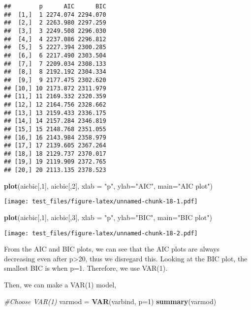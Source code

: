 \documentclass[]{article}
\newenvironment{Shaded}{\begin{snugshade}}{\end{snugshade}}
\newcommand{\KeywordTok}[1]{\textcolor[rgb]{0.13,0.29,0.53}{\textbf{#1}}}
\newcommand{\DataTypeTok}[1]{\textcolor[rgb]{0.13,0.29,0.53}{#1}}
\newcommand{\DecValTok}[1]{\textcolor[rgb]{0.00,0.00,0.81}{#1}}
\newcommand{\StringTok}[1]{\textcolor[rgb]{0.31,0.60,0.02}{#1}}
\newcommand{\CommentTok}[1]{\textcolor[rgb]{0.56,0.35,0.01}{\textit{#1}}}
\newcommand{\NormalTok}[1]{#1}
\begin{document}
\begin{verbatim}
##        p      AIC      BIC
##  [1,]  1 2274.074 2294.070
##  [2,]  2 2263.980 2297.259
##  [3,]  3 2249.508 2296.030
##  [4,]  4 2237.086 2296.812
##  [5,]  5 2227.394 2300.285
##  [6,]  6 2217.490 2303.504
##  [7,]  7 2209.034 2308.133
##  [8,]  8 2192.192 2304.334
##  [9,]  9 2177.475 2302.620
## [10,] 10 2173.872 2311.979
## [11,] 11 2169.332 2320.359
## [12,] 12 2164.756 2328.662
## [13,] 13 2159.433 2336.175
## [14,] 14 2157.284 2346.819
## [15,] 15 2148.768 2351.055
## [16,] 16 2143.984 2358.979
## [17,] 17 2139.605 2367.264
## [18,] 18 2129.737 2370.017
## [19,] 19 2119.909 2372.765
## [20,] 20 2113.135 2378.523
\end{verbatim}

\begin{Shaded}
\begin{Highlighting}[]
\KeywordTok{plot}\NormalTok{(aicbic[,}\DecValTok{1}\NormalTok{], aicbic[,}\DecValTok{2}\NormalTok{], }\DataTypeTok{xlab =} \StringTok{"p"}\NormalTok{, }\DataTypeTok{ylab=}\StringTok{"AIC"}\NormalTok{, }\DataTypeTok{main=}\StringTok{"AIC plot"}\NormalTok{)}
\end{Highlighting}
\end{Shaded}

\texttt{[image: test\_files/figure-latex/unnamed-chunk-18-1.pdf]}

\begin{Shaded}
\begin{Highlighting}[]
\KeywordTok{plot}\NormalTok{(aicbic[,}\DecValTok{1}\NormalTok{], aicbic[,}\DecValTok{3}\NormalTok{], }\DataTypeTok{xlab =} \StringTok{"p"}\NormalTok{, }\DataTypeTok{ylab=}\StringTok{"BIC"}\NormalTok{, }\DataTypeTok{main=}\StringTok{"BIC plot"}\NormalTok{)}
\end{Highlighting}
\end{Shaded}

\texttt{[image: test\_files/figure-latex/unnamed-chunk-18-2.pdf]}

From the AIC and BIC plots, we can see that the AIC plots are always
decreasing even after p\textgreater{}20, thus we disregard this. Looking
at the BIC plot, the smallest BIC is when p=1. Therefore, we use VAR(1).

Then, we can make a VAR(1) model,

\begin{Shaded}
\begin{Highlighting}[]
\CommentTok{#Choose VAR(1)}
\NormalTok{varmod =}\StringTok{ }\KeywordTok{VAR}\NormalTok{(varbind, }\DataTypeTok{p=}\DecValTok{1}\NormalTok{)}
\KeywordTok{summary}\NormalTok{(varmod)}
\end{Highlighting}
\end{Shaded}
\end{document}
